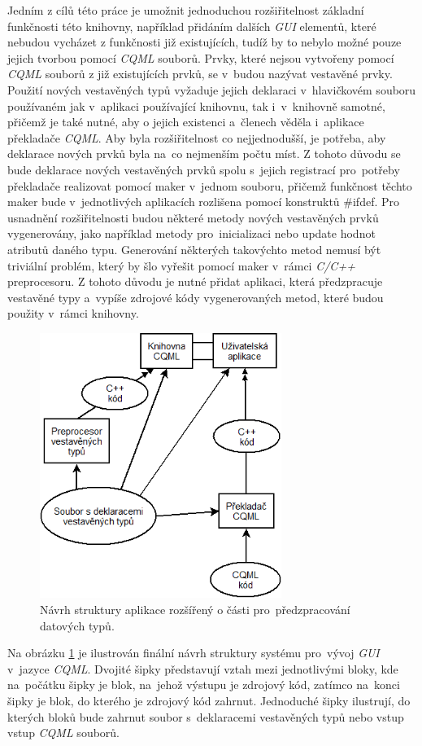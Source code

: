 \documentclass[11pt,twoside,a4paper]{book}
\begin{document}
Jedním z cílů této práce je umožnit jednoduchou rozšiřitelnost základní funkčnosti této knihovny, například přidáním dalších \textit{GUI} elementů, které nebudou vycházet z funkčnosti již existujících, tudíž by to nebylo možné pouze jejich tvorbou pomocí \textit{CQML} souborů. Prvky, které nejsou vytvořeny pomocí \textit{CQML} souborů z již existujících prvků, se v~budou nazývat vestavěné prvky.\\
Použití nových vestavěných typů vyžaduje jejich deklaraci v~hlavičkovém souboru používaném jak v~aplikaci používající knihovnu, tak i~v~knihovně samotné, přičemž je také nutné, aby o jejich existenci a~členech věděla i~aplikace překladače \textit{CQML}. Aby byla rozšiřitelnost co nejjednodušší, je potřeba, aby deklarace nových prvků byla na~co nejmenším počtu míst. Z tohoto důvodu se bude deklarace nových vestavěných prvků spolu s~jejich registrací pro~potřeby překladače realizovat pomocí maker v~jednom souboru, přičemž funkčnost těchto maker bude v~jednotlivých aplikacích rozlišena pomocí konstruktů \#ifdef.
Pro usnadnění rozšiřitelnosti budou některé metody nových vestavěných prvků vygenerovány, jako například metody pro~inicializaci nebo update hodnot atributů daného typu. Generování některých takovýchto metod nemusí být triviální problém, který by šlo vyřešit pomocí maker v~rámci \textit{C/C++} preprocesoru. Z tohoto důvodu je nutné přidat aplikaci, která předzpracuje vestavěné typy a~vypíše zdrojové kódy vygenerovaných metod, které budou použity v~rámci knihovny.\\
\begin{figure}[!ht]
\begin{center}
  \includegraphics[width=0.7\textwidth]{Diagram2}
\caption{{\label{fig:structure2}}Návrh struktury aplikace rozšířený o části pro~předzpracování datových typů.}
\end{center}
\end{figure}
Na obrázku \ref{fig:structure2} je ilustrován finální návrh struktury systému pro~vývoj \textit{GUI} v~jazyce \textit{CQML}. Dvojité šipky představují vztah mezi jednotlivými bloky, kde na~počátku šipky je blok, na~jehož výstupu je zdrojový kód, zatímco na~konci šipky je blok, do kterého je zdrojový kód zahrnut. Jednoduché šipky ilustrují, do kterých bloků bude zahrnut soubor s~deklaracemi vestavěných typů nebo vstup vstup \textit{CQML} souborů.
\end{document}
